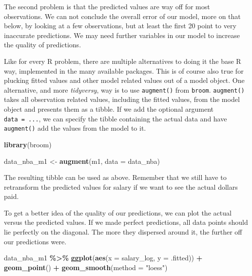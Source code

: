 \documentclass[
]{book}
\newenvironment{Shaded}{\begin{snugshade}}{\end{snugshade}}
\newcommand{\AttributeTok}[1]{\textcolor[rgb]{0.13,0.29,0.53}{#1}}
\newcommand{\FunctionTok}[1]{\textcolor[rgb]{0.13,0.29,0.53}{\textbf{#1}}}
\newcommand{\NormalTok}[1]{#1}
\newcommand{\OtherTok}[1]{\textcolor[rgb]{0.56,0.35,0.01}{#1}}
\newcommand{\SpecialCharTok}[1]{\textcolor[rgb]{0.81,0.36,0.00}{\textbf{#1}}}
\newcommand{\StringTok}[1]{\textcolor[rgb]{0.31,0.60,0.02}{#1}}
\begin{document}
The second problem is that the predicted values are way off for most
observations. We can not conclude the overall error of our model, more on that
below, by looking at a few observations, but at least the first 20 point to very
inaccurate predictions. We may need further variables in our model to increase
the quality of predictions.

Like for every R problem, there are multiple alternatives to doing it the base R
way, implemented in the many available packages. This is of course also true for
plucking fitted values and other model related values out of a model object.
One alternative, and more \emph{tidyversy}, way is to use \texttt{augment()} from \texttt{broom}.
\texttt{augment()} takes all observation related values, including the fitted values,
from the model object and presents them as a tibble. If we add the optional
argument \texttt{data\ =\ ...}, we can specify the tibble containing the actual data
and have \texttt{augment()} add the values from the model to it.

\begin{Shaded}
\begin{Highlighting}[]
\FunctionTok{library}\NormalTok{(broom)}

\NormalTok{data\_nba\_m1 }\OtherTok{\textless{}{-}} \FunctionTok{augment}\NormalTok{(m1, }\AttributeTok{data =}\NormalTok{ data\_nba)}
\end{Highlighting}
\end{Shaded}

The resulting tibble can be used as above. Remember that we still have to
retransform the predicted values for salary if we want to see the actual dollars
paid.

To get a better idea of the quality of our predictions, we can plot the actual
versus the predicted values. If we made perfect predictions, all data points
should lie perfectly on the diagonal. The more they dispersed around it, the
further off our predictions were.

\begin{Shaded}
\begin{Highlighting}[]
\NormalTok{data\_nba\_m1 }\SpecialCharTok{\%\textgreater{}\%}
  \FunctionTok{ggplot}\NormalTok{(}\FunctionTok{aes}\NormalTok{(}\AttributeTok{x =}\NormalTok{ salary\_log, }\AttributeTok{y =}\NormalTok{ .fitted)) }\SpecialCharTok{+}
  \FunctionTok{geom\_point}\NormalTok{() }\SpecialCharTok{+}
  \FunctionTok{geom\_smooth}\NormalTok{(}\AttributeTok{method =} \StringTok{"loess"}\NormalTok{)}
\end{Highlighting}
\end{Shaded}
\end{document}
